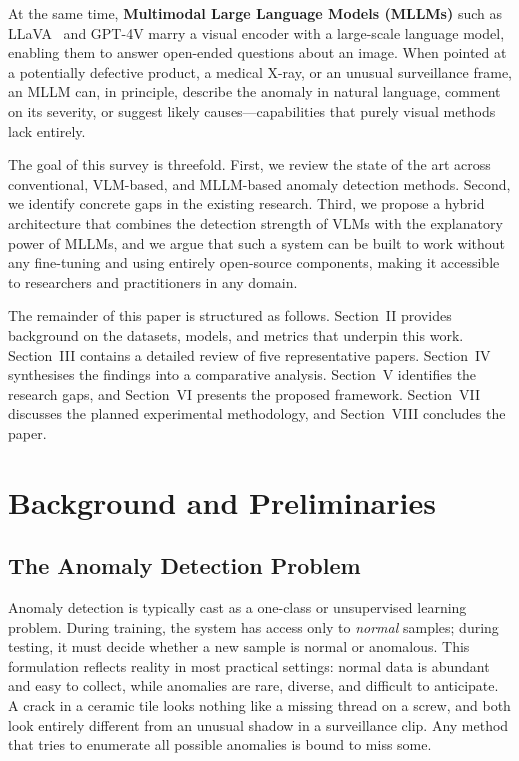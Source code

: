 \documentclass[conference]{IEEEtran}
\begin{document}
At the same time, \textbf{Multimodal Large Language Models (MLLMs)} such as LLaVA~\cite{liu2023llava} and GPT-4V marry a visual encoder with a large-scale language model, enabling them to answer open-ended questions about an image. When pointed at a potentially defective product, a medical X-ray, or an unusual surveillance frame, an MLLM can, in principle, describe the anomaly in natural language, comment on its severity, or suggest likely causes---capabilities that purely visual methods lack entirely.

The goal of this survey is threefold. First, we review the state of the art across conventional, VLM-based, and MLLM-based anomaly detection methods. Second, we identify concrete gaps in the existing research. Third, we propose a hybrid architecture that combines the detection strength of VLMs with the explanatory power of MLLMs, and we argue that such a system can be built to work without any fine-tuning and using entirely open-source components, making it accessible to researchers and practitioners in any domain.

The remainder of this paper is structured as follows. Section~II provides background on the datasets, models, and metrics that underpin this work. Section~III contains a detailed review of five representative papers. Section~IV synthesises the findings into a comparative analysis. Section~V identifies the research gaps, and Section~VI presents the proposed framework. Section~VII discusses the planned experimental methodology, and Section~VIII concludes the paper.

\section{Background and Preliminaries}

\subsection{The Anomaly Detection Problem}

Anomaly detection is typically cast as a one-class or unsupervised learning problem. During training, the system has access only to \textit{normal} samples; during testing, it must decide whether a new sample is normal or anomalous. This formulation reflects reality in most practical settings: normal data is abundant and easy to collect, while anomalies are rare, diverse, and difficult to anticipate. A crack in a ceramic tile looks nothing like a missing thread on a screw, and both look entirely different from an unusual shadow in a surveillance clip. Any method that tries to enumerate all possible anomalies is bound to miss some.
\end{document}
